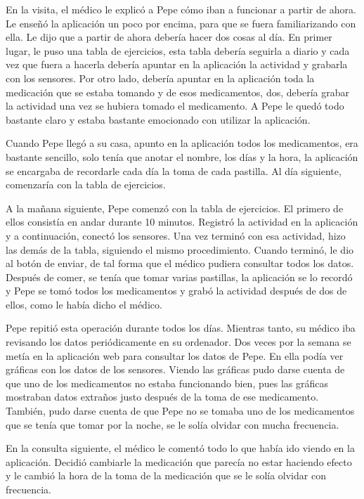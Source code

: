 \documentclass[11pt,spanish]{article}
\begin{document}
En la visita, el médico le explicó a Pepe cómo iban a funcionar a partir de ahora. Le enseñó la aplicación un poco por encima, para que se fuera familiarizando con ella. Le dijo que a partir de ahora debería hacer dos cosas al día. En primer lugar, le puso una tabla de ejercicios, esta tabla debería seguirla a diario y cada vez que fuera a hacerla debería apuntar en la aplicación la actividad y grabarla con los sensores. Por otro lado, debería apuntar en la aplicación toda la medicación que se estaba tomando y de esos medicamentos, dos, debería grabar la actividad una vez se hubiera tomado el medicamento. A Pepe le quedó todo bastante claro y estaba bastante emocionado con utilizar la aplicación.
\newline

Cuando Pepe llegó a su casa, apunto en la aplicación todos los medicamentos, era bastante sencillo, solo tenía que anotar el nombre, los días y la hora, la aplicación se encargaba de recordarle cada día la toma de cada pastilla. Al día siguiente, comenzaría con la tabla de ejercicios.
\newline

A la mañana siguiente, Pepe comenzó con la tabla de ejercicios. El primero de ellos consistía en andar durante 10 minutos. Registró la actividad en la aplicación y a continuación, conectó los sensores. Una vez terminó con esa actividad, hizo las demás de la tabla, siguiendo el mismo procedimiento. Cuando terminó, le dio al botón de enviar, de tal forma que el médico pudiera consultar todos los datos. Después de comer, se tenía que tomar varias pastillas, la aplicación se lo recordó y Pepe se tomó todos los medicamentos y grabó la actividad después de dos de ellos, como le había dicho el médico.
\newline

Pepe repitió esta operación durante todos los días. Mientras tanto, su médico iba revisando los datos periódicamente en su ordenador. Dos veces por la semana se metía en la aplicación web para consultar los datos de Pepe. En ella podía ver gráficas con los datos de los sensores. Viendo las gráficas pudo darse cuenta de que uno de los medicamentos no estaba funcionando bien, pues las gráficas mostraban datos extraños justo después de la toma de ese medicamento. También, pudo darse cuenta de que Pepe no se tomaba uno de los medicamentos que se tenía que tomar por la noche, se le solía olvidar con mucha frecuencia.
\newline

En la consulta siguiente, el médico le comentó todo lo que había ido viendo en la aplicación. Decidió cambiarle la medicación que parecía no estar haciendo efecto y le cambió la hora de la toma de la medicación que se le solía olvidar con frecuencia.
\newpage
\end{document}
